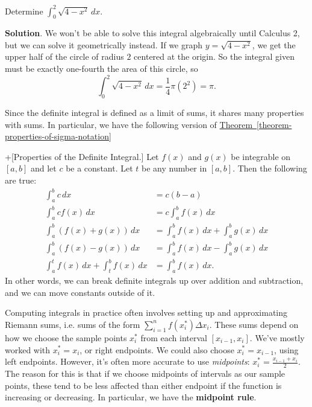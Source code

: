 \documentclass[10pt,]{book}
\newcommand{\terminology}[1]{\textbf{#1}}
\theoremstyle{ptxplainnotitle}
\theoremstyle{ptxplaintitle}
\theoremstyle{ptxplainnotitle}
\theoremstyle{ptxplaintitle}
\theoremstyle{ptxplainnotitle}
\theoremstyle{ptxplaintitle}
\theoremstyle{ptxdefinitionnotitle}
\theoremstyle{ptxdefinitiontitle}
\theoremstyle{ptxdefinitionnotitle}
\theoremstyle{ptxdefinitiontitle}
\theoremstyle{ptxdefinitionnotitle}
\theoremstyle{ptxdefinitiontitle}
\theoremstyle{ptxdefinitionnotitle}
\theoremstyle{ptxdefinitiontitle}
\theoremstyle{ptxdefinitionnotitle}
\theoremstyle{ptxdefinitiontitle}
\numberwithin{equation}{section}
\begin{document}
\begin{example}\label{example-a-radical-integral}
\hypertarget{p-433}{}%
Determine \(\int_{0}^{2}\sqrt{4-x^{2}}\,dx\).%
\par\smallskip%
\noindent\textbf{Solution}.\hypertarget{solution-95}{}\quad%
\hypertarget{p-434}{}%
We won't be able to solve this integral algebraically until Calculus 2, but we can solve it geometrically instead. If we graph \(y = \sqrt{4-x^{2}}\), we get the upper half of the circle of radius \(2\) centered at the origin. So the integral given must be exactly one-fourth the area of this circle, so%
\begin{equation*}
\int_{0}^{2}\sqrt{4-x^{2}}\,dx = \frac{1}{4}\pi(2^{2}) = \pi.
\end{equation*}
%
\end{example}
\hypertarget{p-435}{}%
Since the definite integral is defined as a limit of sums, it shares many properties with sums. In particular, we have the following version of \hyperref[theorem-properties-of-sigma-notation]{Theorem~\ref{theorem-properties-of-sigma-notation}}%
\begin{theorem}+[{Properties of the Definite Integral.}]\label{theorem-properties-of-the-definite-integral}
\hypertarget{p-436}{}%
Let \(f(x)\) and \(g(x)\) be integrable on \([a,b]\) and let \(c\) be a constant. Let \(t\) be any number in \([a,b]\). Then the following are true:%
\begin{align*}
\int_{a}^{b}c\,dx & = c(b-a) \\
\int_{a}^{b}cf(x)\,dx & = c\int_{a}^{b}f(x)\,dx \\
\int_{a}^{b}(f(x)+g(x))\,dx & = \int_{a}^{b}f(x)\,dx + \int_{a}^{b}g(x)\,dx\\
\int_{a}^{b}(f(x) - g(x))\,dx & = \int_{a}^{b}f(x)\,dx - \int_{a}^{b}g(x)\,dx \\
\int_{a}^{t}f(x)\,dx + \int_{t}^{b}f(x)\,dx & = \int_{a}^{b}f(x)\,dx. 
\end{align*}
In other words, we can break definite integrals up over addition and subtraction, and we can move constants outside of it.%
\end{theorem}
\hypertarget{p-437}{}%
Computing integrals in practice often involves setting up and approximating Riemann sums, i.e. sums of the form \(\sum_{i=1}^{n}f(x_{i}^{*})\Delta x_{i}\). These sums depend on how we choose the sample points \(x_{i}^{*}\) from each interval \([x_{i-1},x_{i}]\). We've mostly worked with \(x_{i}^{*} = x_{i}\), or right endpoints. We could also choose \(x_{i}^{*} = x_{i-1}\), using left endpoints. However, it's often more accurate to use \emph{midpoints}: \(x_{i}^{*} = \frac{x_{i-1}+x_{i}}{2}\). The reason for this is that if we choose midpoints of intervals as our sample points, these tend to be less affected than either endpoint if the function is increasing or decreasing. In particular, we have the \terminology{midpoint rule}.%
\end{document}
